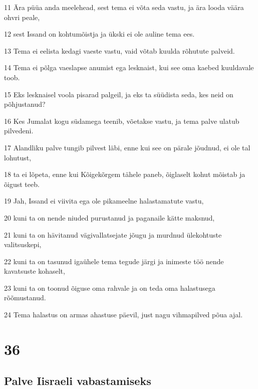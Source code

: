\par 11 Ära püüa anda meelehead, sest tema ei võta seda vastu, ja ära looda väära ohvri peale,
\par 12 sest Issand on kohtumõistja ja ükski ei ole auline tema ees.
\par 13 Tema ei eelista kedagi vaeste vastu, vaid võtab kuulda rõhutute palveid.
\par 14 Tema ei põlga vaeslapse anumist ega lesknaist, kui see oma kaebed kuuldavale toob.
\par 15 Eks lesknaisel voola pisarad palgeil, ja eks ta süüdista seda, kes neid on põhjustanud?
\par 16 Kes Jumalat kogu südamega teenib, võetakse vastu, ja tema palve ulatub pilvedeni.
\par 17 Alandliku palve tungib pilvest läbi, enne kui see on pärale jõudnud, ei ole tal lohutust,
\par 18 ta ei lõpeta, enne kui Kõigekõrgem tähele paneb, õiglaselt kohut mõistab ja õigust teeb.
\par 19 Jah, Issand ei viivita ega ole pikameelne halastamatute vastu,
\par 20 kuni ta on nende niuded purustanud ja paganaile kätte maksnud,
\par 21 kuni ta on hävitanud vägivallatsejate jõugu ja murdnud ülekohtuste valitsuskepi,
\par 22 kuni ta on tasunud igaühele tema tegude järgi ja inimeste töö nende kavatsuste kohaselt,
\par 23 kuni ta on toonud õiguse oma rahvale ja on teda oma halastusega rõõmustanud.
\par 24 Tema halastus on armas ahastuse päevil, just nagu vihmapilved põua ajal.

\chapter{36}

\section*{Palve Iisraeli vabastamiseks}


